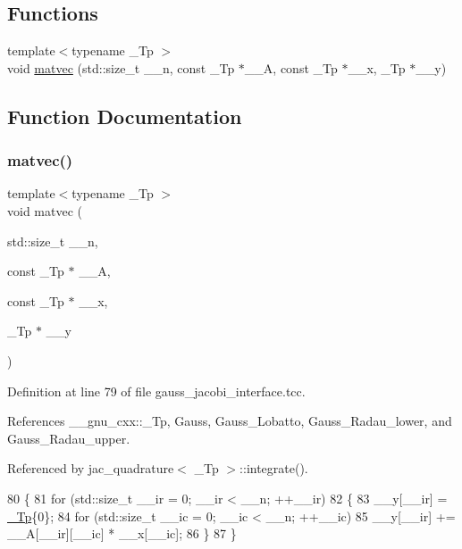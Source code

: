 \subsection*{Functions}
\begin{DoxyCompactItemize}
\item 
{\footnotesize template$<$typename \+\_\+\+Tp $>$ }\\void \hyperlink{gauss__jacobi__interface_8tcc_a3a2988b4408ce3696d34df82f1dcba57}{matvec} (std\+::size\+\_\+t \+\_\+\+\_\+n, const \+\_\+\+Tp $\ast$\+\_\+\+\_\+A, const \+\_\+\+Tp $\ast$\+\_\+\+\_\+x, \+\_\+\+Tp $\ast$\+\_\+\+\_\+y)
\end{DoxyCompactItemize}


\subsection{Function Documentation}
\mbox{\label{gauss__jacobi__interface_8tcc_a3a2988b4408ce3696d34df82f1dcba57}} 
\subsubsection{\texorpdfstring{matvec()}{matvec()}}
{\footnotesize\ttfamily template$<$typename \+\_\+\+Tp $>$ \\
void matvec (\begin{DoxyParamCaption}\item[{std\+::size\+\_\+t}]{\+\_\+\+\_\+n,  }\item[{const \+\_\+\+Tp $\ast$}]{\+\_\+\+\_\+A,  }\item[{const \+\_\+\+Tp $\ast$}]{\+\_\+\+\_\+x,  }\item[{\+\_\+\+Tp $\ast$}]{\+\_\+\+\_\+y }\end{DoxyParamCaption})}



Definition at line 79 of file gauss\+\_\+jacobi\+\_\+interface.\+tcc.



References \+\_\+\+\_\+gnu\+\_\+cxx\+::\+\_\+\+Tp, Gauss, Gauss\+\_\+\+Lobatto, Gauss\+\_\+\+Radau\+\_\+lower, and Gauss\+\_\+\+Radau\+\_\+upper.



Referenced by jac\+\_\+quadrature$<$ \+\_\+\+Tp $>$\+::integrate().


\begin{DoxyCode}
80   \{
81     \textcolor{keywordflow}{for} (std::size\_t \_\_ir = 0; \_\_ir < \_\_n; ++\_\_ir)
82       \{
83         \_\_y[\_\_ir] = \hyperlink{namespace____gnu__cxx_a3b19a9c800ca194374ef9172290f7d79}{\_Tp}\{0\};
84         \textcolor{keywordflow}{for} (std::size\_t \_\_ic = 0; \_\_ic < \_\_n; ++\_\_ic)
85           \_\_y[\_\_ir] += \_\_A[\_\_ir][\_\_ic] * \_\_x[\_\_ic];
86       \}
87   \}
\end{DoxyCode}
